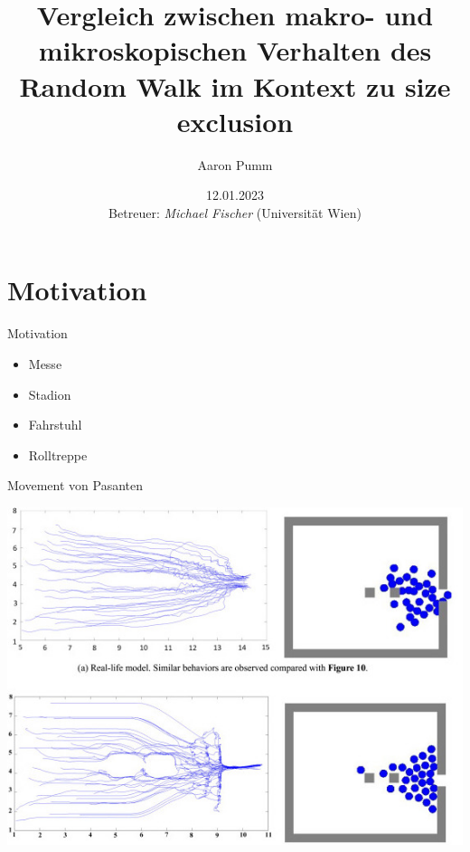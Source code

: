 \documentclass[xcolor=dvipsnames, aspectratio=169]{beamer}
\title{Vergleich zwischen makro- und mikroskopischen Verhalten des Random Walk im Kontext zu size exclusion}
\author{Aaron Pumm}
\institute{Universität Wien}
\date{12.01.2023 \\ \vspace{0.2in} \footnotesize{Betreuer: \textit{Michael Fischer} (Universität Wien)}}
\begin{document}

\begin{frame}[t]
	\titlepage
\end{frame}

\logo{}




\section{Motivation}

\begin{frame}[t]{Motivation}
	\begin{itemize}
		\item<1-> Messe
		\item<2-> Stadion
		\item<3-> Fahrstuhl
		\item<4-> Rolltreppe
	\end{itemize}
\end{frame}

\begin{frame}[t]{Movement von Pasanten}
	\begin{center}
		\includegraphics{figures/pedestrianMovement.jpg} 
	\end{center}
\end{frame}
\end{document}
